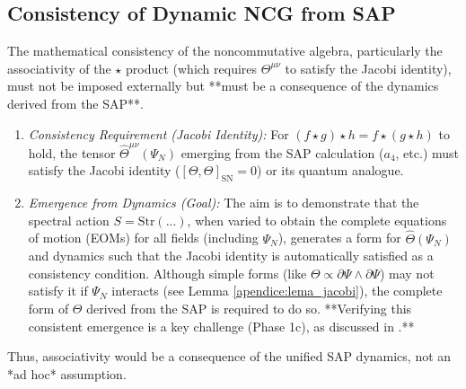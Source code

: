 \documentclass[11pt, a4paper]{article}
\theoremstyle{remark}
\newcommand{\Op}[1]{\hat{#1}}
\begin{document}
\subsection{Consistency of Dynamic NCG from SAP}
The mathematical consistency of the noncommutative algebra, particularly the associativity of the \( \star \) product (which requires \( \Theta^{\mu\nu} \) to satisfy the Jacobi identity), must not be imposed externally but **must be a consequence of the dynamics derived from the SAP**.

\begin{enumerate}
    \item \textit{Consistency Requirement (Jacobi Identity):} For \( (f \star g) \star h = f \star (g \star h) \) to hold, the tensor \( \Op{\Theta}^{\mu\nu}(\Psi_N) \) emerging from the SAP calculation (\(a_4\), etc.) must satisfy the Jacobi identity (\( [\Theta, \Theta]_{\text{SN}} = 0 \)) or its quantum analogue.
    \item \textit{Emergence from Dynamics (Goal):} The aim is to demonstrate that the spectral action \( S = \text{Str}(...) \), when varied to obtain the complete equations of motion (EOMs) for all fields (including \( \Psi_N \)), generates a form for \( \Op{\Theta}(\Psi_N) \) and dynamics such that the Jacobi identity is automatically satisfied as a consistency condition. Although simple forms (like \( \Theta \propto \partial \Psi \wedge \partial \Psi \)) may not satisfy it if \( \Psi_N \) interacts (see Lemma \ref{apendice:lema_jacobi}), the complete form of \( \Theta \) derived from the SAP is required to do so. **Verifying this consistent emergence is a key challenge (Phase 1c), as discussed in .**
\end{enumerate}
Thus, associativity would be a consequence of the unified SAP dynamics, not an *ad hoc* assumption.
\end{document}
